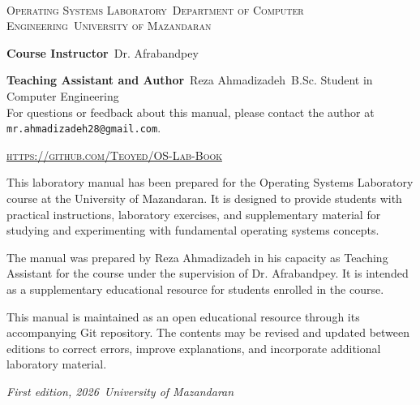 
\newpage
~\vfill
\thispagestyle{empty}

\noindent \textsc{Operating Systems Laboratory}\
\noindent \textsc{Department of Computer Engineering}\
\noindent \textsc{University of Mazandaran}\

\vspace{0.6cm}

\noindent \textbf{Course Instructor}\
\noindent Dr. Afrabandpey\

\vspace{0.4cm}

\noindent \textbf{Teaching Assistant and Author}\
\noindent Reza Ahmadizadeh\
\noindent B.Sc. Student in Computer Engineering\
\\
\vspace{0.6cm}
\noindent For questions or feedback about this manual, please contact the author at \texttt{mr.ahmadizadeh28@gmail.com}.\

\vspace{0.6cm}

\noindent \textsc{\url{https://github.com/Teoyed/OS-Lab-Book}}\\

\vspace{0.6cm}

\noindent This laboratory manual has been prepared for the Operating Systems Laboratory course at the University of Mazandaran. It is designed to provide students with practical instructions, laboratory exercises, and supplementary material for studying and experimenting with fundamental operating systems concepts.

\vspace{0.4cm}

\noindent The manual was prepared by Reza Ahmadizadeh in his capacity as Teaching Assistant for the course under the supervision of Dr. Afrabandpey. It is intended as a supplementary educational resource for students enrolled in the course.

\vspace{0.6cm}

\noindent This manual is maintained as an open educational resource through its accompanying Git repository. The contents may be revised and updated between editions to correct errors, improve explanations, and incorporate additional laboratory material.

\vspace{0.6cm}

\noindent \textit{First edition, 2026}\
\noindent \textit{University of Mazandaran}

